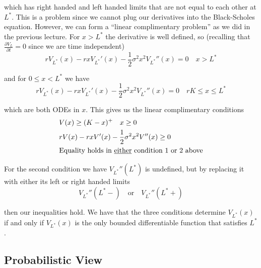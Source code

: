 \documentclass[12pt]{article}
\newlength\tindent
\renewcommand{\indent}{\hspace*{\tindent}}
\begin{document}
which has right handed and left handed limits that are not equal to each other at $L^*$. This is a problem since we cannot plug our derivatives into the Black-Scholes equation. However, we can form a ``linear complimentary problem'' as we did in the previous lecture. For $x > L^*$ the derivative is well defined, so (recalling that $\frac{\partial V_L}{\partial t} = 0$ since we are time independent)
\begin{equation*}
	rV_{L^*}(x) - rxV_{L^*}'(x) - \frac{1}{2}\sigma^2x^2V_{L^*}''(x) = 0 \quad x > L^*
\end{equation*}

and for $0 \leq x < L^*$ we have
\begin{equation*}
		rV_{L^*}(x) - rxV_{L^*}'(x) - \frac{1}{2}\sigma^2x^2V_{L^*}''(x) = 0 \quad rK \leq x \leq L^*
\end{equation*}

which are both ODEs in $x$. This gives us the linear complimentary conditions
\begin{align*}
	&V(x) \geq (K - x)^+ \quad x \geq 0 \\
	&rV(x) - rxV'(x) - \frac{1}{2}\sigma^2x^2V''(x) \geq 0 \\
	&\text{Equality holds in \underline{either} condition 1 or 2 above}
\end{align*}

\indent For the second condition we have $V_{L^*}''(L^*)$ is undefined, but by replacing it with either its left or right handed limits
\begin{equation*}
	V_{L^*}''(L^*-) \quad \text{or} \quad V_{L^*}''(L^*+)
\end{equation*}

then our inequalities hold. We have that the three conditions determine $V_{L^*}(x)$ if and only if $V_{L^*}(x)$ is the only bounded differentiable function that satisfies $L^*$.

\subsection{Probabilistic View}
\end{document}
